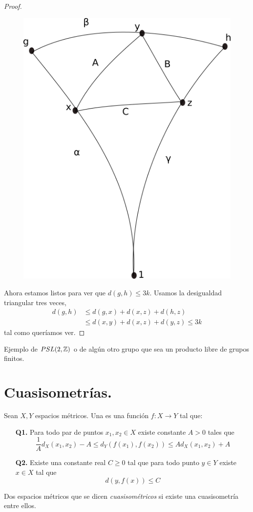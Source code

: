 \documentclass[tesis.tex]{subfiles}
\begin{document}
\begin{proof}
\begin{figure}[H]
	\centering
	\includegraphics[scale=0.5]{treewidth.png}
	\caption*{}
\end{figure}



Ahora estamos listos para ver que $d(g,h) \le 3k$. Usamos la desigualdad triangular tres veces,
\begin{align*}
	d(g,h) & \le d(g,x) + d(x,z) + d(h,z) \\
	& \le d(x,y) + d(x,z) + d(y,z) \le 3k
\end{align*}
tal como queríamos ver.
\end{proof}

\begin{ej}
	Ejemplo de $PSL(2,\mathbb{Z})$ o de algún otro grupo que sea un producto libre de grupos finitos.
\end{ej}


\section{Cuasisometrías.}


\begin{deff}
	Sean $X,Y$ espacios métricos. Una  es una función $f:X \to Y$ tal que:
	\begin{itemize}
	\item[\textbf{Q1.}] Para todo par de puntos $x_1,x_2 \in X$ existe constante $A > 0$ tales que
	\[
	\frac{1}{A} d_X(x_1,x_2) - A \le d_Y(f(x_1),f(x_2)) \le A d_X(x_1,x_2) + A
	\]
	\item[\textbf{Q2.}] Existe una constante real $C \ge 0$ tal que para todo punto $y \in Y$ existe $x \in X$ tal que 
	\[
	d(y,f(x)) \le C
	\]
	\end{itemize}
 	Dos espacios métricos que se dicen \emph{cuasisométricos} si existe una cuasisometría entre ellos.
\end{deff}
\end{document}
